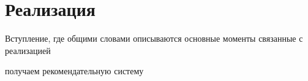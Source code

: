 \section{Реализация}
    Вступление, где общими словами описываются основные моменты связанные с реализацией

    получаем рекомендательную систему

    

    

    

    

    
